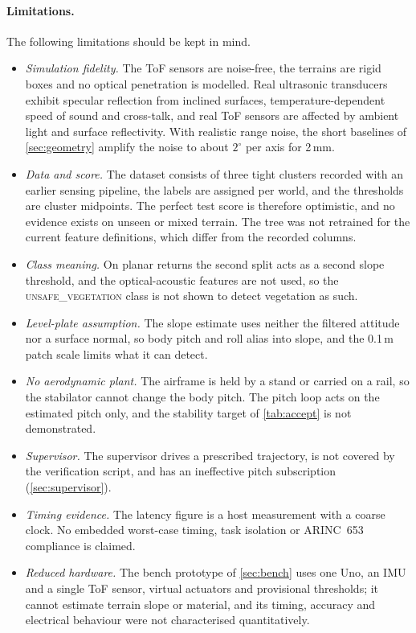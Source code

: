 \documentclass[11pt,a4paper]{article}
\begin{document}
\paragraph{Limitations.} The following limitations should be kept in mind.
\begin{itemize}
  \item \emph{Simulation fidelity.} The ToF sensors are noise-free, the terrains are rigid boxes and no optical penetration is modelled. Real ultrasonic transducers exhibit specular reflection from inclined surfaces, temperature-dependent speed of sound and cross-talk, and real ToF sensors are affected by ambient light and surface reflectivity. With realistic range noise, the short baselines of \cref{sec:geometry} amplify the noise to about $2^\circ$ per axis for 2\,mm.
  \item \emph{Data and score.} The dataset consists of three tight clusters recorded with an earlier sensing pipeline, the labels are assigned per world, and the thresholds are cluster midpoints. The perfect test score is therefore optimistic, and no evidence exists on unseen or mixed terrain. The tree was not retrained for the current feature definitions, which differ from the recorded columns.
  \item \emph{Class meaning.} On planar returns the second split acts as a second slope threshold, and the optical-acoustic features are not used, so the \textsc{unsafe\_vegetation} class is not shown to detect vegetation as such.
  \item \emph{Level-plate assumption.} The slope estimate uses neither the filtered attitude nor a surface normal, so body pitch and roll alias into slope, and the 0.1\,m patch scale limits what it can detect.
  \item \emph{No aerodynamic plant.} The airframe is held by a stand or carried on a rail, so the stabilator cannot change the body pitch. The pitch loop acts on the estimated pitch only, and the stability target of \cref{tab:accept} is not demonstrated.
  \item \emph{Supervisor.} The supervisor drives a prescribed trajectory, is not covered by the verification script, and has an ineffective pitch subscription (\cref{sec:supervisor}).
  \item \emph{Timing evidence.} The latency figure is a host measurement with a coarse clock. No embedded worst-case timing, task isolation or ARINC~653 compliance is claimed.
  \item \emph{Reduced hardware.} The bench prototype of \cref{sec:bench} uses one Uno, an IMU and a single ToF sensor, virtual actuators and provisional thresholds; it cannot estimate terrain slope or material, and its timing, accuracy and electrical behaviour were not characterised quantitatively.
\end{itemize}
 
\end{document}
